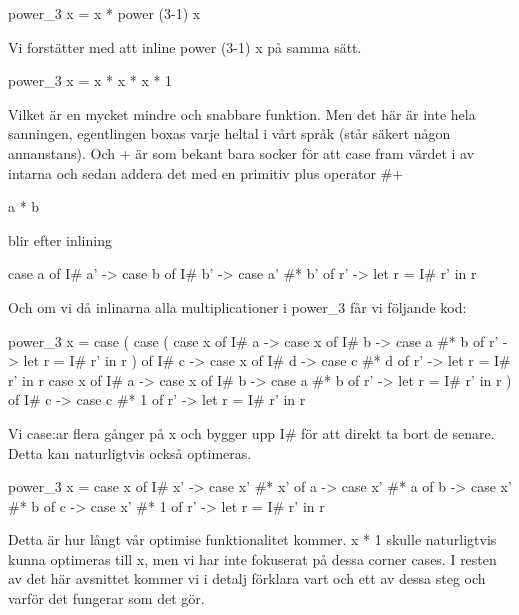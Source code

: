 \documentclass[../Optimise]{subfiles}
\begin{document}
\begin{codeEx}
power_3 x = x * power (3-1) x
\end{codeEx}

Vi forstätter med att inline power (3-1) x på samma sätt.

\begin{codeEx}
power_3 x = x * x * x * 1
\end{codeEx}

Vilket är en mycket mindre och snabbare funktion.
Men det här är inte hela sanningen, egentlingen boxas varje heltal i vårt språk 
(står säkert någon annanstans). Och + är som bekant bara socker för att case 
fram värdet i av intarna och sedan addera det med en primitiv plus operator \#+

\begin{codeEx}
a * b
\end{codeEx}

blir efter inlining

\begin{codeEx}
case a of
    I# a' -> case b of
        I# b' -> case  a' #* b' of
            r' -> let r = I# r'
                      in r
\end{codeEx}

Och om vi då inlinarna alla multiplicationer i power\_3 får vi följande kod:
\begin{codeEx}
power_3 x = case (
                     case (
                     case x of
                        I# a -> case x of
                            I# b -> case a #* b of
                                  r' -> let r = I# r'
                                   in r
                        )
                          of
                        I# c -> case x of
                            I# d -> case c #* d of
                                  r' -> let r = I# r'
                                   in r
                   case x of
                        I# a -> case x of
                            I# b -> case a #* b of
                                  r' -> let r = I# r'
                                   in r
                        )
                          of
                        I# c -> case c #* 1 of
                                  r' -> let r = I# r'
                                   in r                                                         
\end{codeEx}


Vi case:ar flera gånger på x och bygger upp I\# för att direkt ta bort de senare.
 Detta kan naturligtvis också optimeras.

\begin{codeEx}
power_3 x = case x of
               I# x' -> case x' #* x' of
                       a -> case x' #* a of
                          b -> case x' #* b of
                             c -> case x' #* 1 of
                               r' -> let r = I# r'
                                 in r
\end{codeEx}

Detta är hur långt vår optimise funktionalitet kommer. x * 1 skulle naturligtvis
kunna optimeras till x, men vi har inte fokuserat på dessa corner cases.
I resten av det här avsnittet kommer vi i detalj förklara vart och ett av dessa 
steg och varför det fungerar som det gör.
\end{document}
